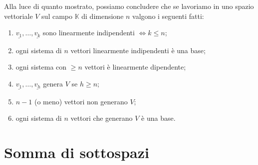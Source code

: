 Alla luce di quanto mostrato, possiamo concludere che se lavoriamo in uno spazio vettoriale $V$ sul campo $\mathbb{K}$ di dimensione $n$ valgono i seguenti fatti:
\begin{enumerate}[label=\protect\circled{\arabic*}]
    \item $\underline{v_1}, \ldots, \underline{v_k}$ sono linearmente indipendenti $\iff k \leq n$;
    \item ogni sistema di $n$ vettori linearmente indipendenti è una base;
    \item ogni sistema con $\geq n$ vettori è linearmente dipendente;
    \item $\underline{v_1}, \ldots, \underline{v_h}$ genera $V$ se $h \geq n$;
    \item $n-1$ (o meno) vettori non generano $V$;
    \item ogni sistema di $n$ vettori che generano $V$ è una base.
\end{enumerate}
\section{Somma di sottospazi}


